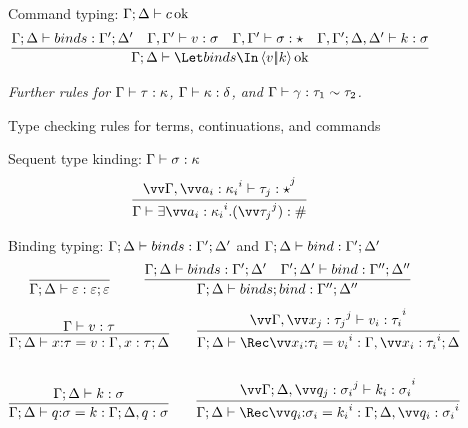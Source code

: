 \documentclass{article}
\begin{document}
\begin{figure}[h]
Command typing: $\Gamma; \Delta \vdash c \operatorname{ok}$
\begin{gather*}
  \infer
  {\Gamma;\Delta \vdash \mcut{\tm}{\ko}{\binds} \Ok}
  {
    \Gamma;\Delta \vdash \binds : \Gamma';\Delta'
    &
    \Gamma,\Gamma' \vdash \tm : \sty
    &
    \Gamma,\Gamma' \vdash \sty : \star
    &
    \Gamma,\Gamma'; \Delta,\Delta' \vdash \ko : \sty
  }
\end{gather*}

\emph{Further rules for $\Gamma \vdash \tau : \kappa$,
  $\Gamma \vdash \kappa : \delta$, and
  $\Gamma \vdash \gamma : \tau_1 \sim \tau_2$.}
\caption{Type checking rules for terms, continuations, and commands}
\label{fig:typing-rules}
\end{figure}

\begin{figure}[h]
\centering
Sequent type kinding: $\Gamma \vdash \sigma : \kappa$
\begin{gather*}
  \infer
  {\Gamma \vdash \stackty{\vect[i]{a_i:\ki_i}}{\vect[j]{\ty_j}} : \hash}
  {
    \vect[j]{
      \Gamma, \vect[i]{a_i:\ki_i} \vdash \ty_j : \star
    }
  }
\end{gather*}

Binding typing: $\Gamma; \Delta \vdash binds : \Gamma'; \Delta'$ and
$\Gamma; \Delta \vdash bind : \Gamma'; \Delta'$
\begin{gather*}
  \axiom{\Gamma;\Delta \vdash \mt : \mt;\mt}
  \qquad
  \infer
  {\Gamma;\Delta \vdash \binds; \abind : \Gamma'';\Delta''}
  {
    \Gamma;\Delta \vdash \binds : \Gamma';\Delta'
    &
    \Gamma';\Delta' \vdash \abind : \Gamma'';\Delta''
  }
\end{gather*}
\begin{gather*}
  \infer
  {\Gamma;\Delta \vdash \bind{\ann x \ty}{\tm} : \Gamma,x:\ty;\Delta}
  {\Gamma \vdash \tm : \ty}
  \qquad
  \infer
  {
    \Gamma;\Delta
    \vdash
    \Rec\vect[i]{\bind{\ann{x_i}{\ty_i}}{\tm_i}}
    :
    \Gamma,\vect[i]{x_i:\ty_i};\Delta
  }
  {
    \vect[i]
    {
      \Gamma, \vect[j]{x_j:\ty_j} \vdash \tm_i : \ty_i
    }
  }
  \\\\
  \infer
  {\Gamma;\Delta \vdash \bind{\ann q \sty}{\ko} : \Gamma;\Delta,q:\sty}
  {\Gamma;\Delta \vdash \ko : \sty}
  \qquad
  \infer
  {
    \Gamma;\Delta
    \vdash
    \Rec\vect[i]{\bind{\ann{q_i}{\sty_i}}{\ko_i}}
    :
    \Gamma;\Delta,\vect[i]{q_i:\sty_i}
  }
  {
    \vect[i]
    {
      \Gamma;\Delta,\vect[j]{q_j:\sty_i} \vdash \ko_i : \sty_i
    }
  }  
\end{gather*}


\end{figure}
\end{document}
